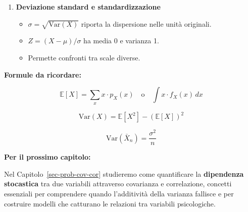 \documentclass[
  italian,
  letterpaper,
  a4paper,
  11pt,
  open=any]{scrbook}
\providecommand{\tightlist}{%
  \setlength{\itemsep}{0pt}\setlength{\parskip}{0pt}}
\theoremstyle{plain}
\theoremstyle{definition}
\theoremstyle{definition}
\theoremstyle{remark}
\begin{document}
\begin{tcolorbox}
\begin{enumerate}
  \begin{itemize}
  \tightlist
  \item
    \(\text{Var}(aX + b) = a^2 \text{Var}(X)\).
  \item
    \(\text{Var}(X + Y) = \text{Var}(X) + \text{Var}(Y)\) \textbf{solo
    se} \(X \perp Y\).
  \item
    \(\text{Var}(\bar{X}) = \sigma^2/n\) (fondamento della precisione
    statistica).
  \end{itemize}
\item
  \textbf{Deviazione standard e standardizzazione}

  \begin{itemize}
  \tightlist
  \item
    \(\sigma = \sqrt{\text{Var}(X)}\) riporta la dispersione nelle unità
    originali.
  \item
    \(Z = (X - \mu)/\sigma\) ha media 0 e varianza 1.
  \item
    Permette confronti tra scale diverse.
  \end{itemize}
\end{enumerate}

\textbf{Formule da ricordare:}

\[
\mathbb{E}[X] = \sum_x x \cdot p_X(x) \quad \text{o} \quad \int x \cdot f_X(x)\,dx
\]

\[
\text{Var}(X) = \mathbb{E}[X^2] - (\mathbb{E}[X])^2
\]

\[
\text{Var}(\bar{X}_n) = \frac{\sigma^2}{n}
\]

\textbf{Per il prossimo capitolo:}

Nel Capitolo~\ref{sec-prob-cov-cor} studieremo come quantificare la
\textbf{dipendenza stocastica} tra due variabili attraverso covarianza e
correlazione, concetti essenziali per comprendere quando l'additività
della varianza fallisce e per costruire modelli che catturano le
relazioni tra variabili psicologiche.

\end{tcolorbox}
\end{document}
